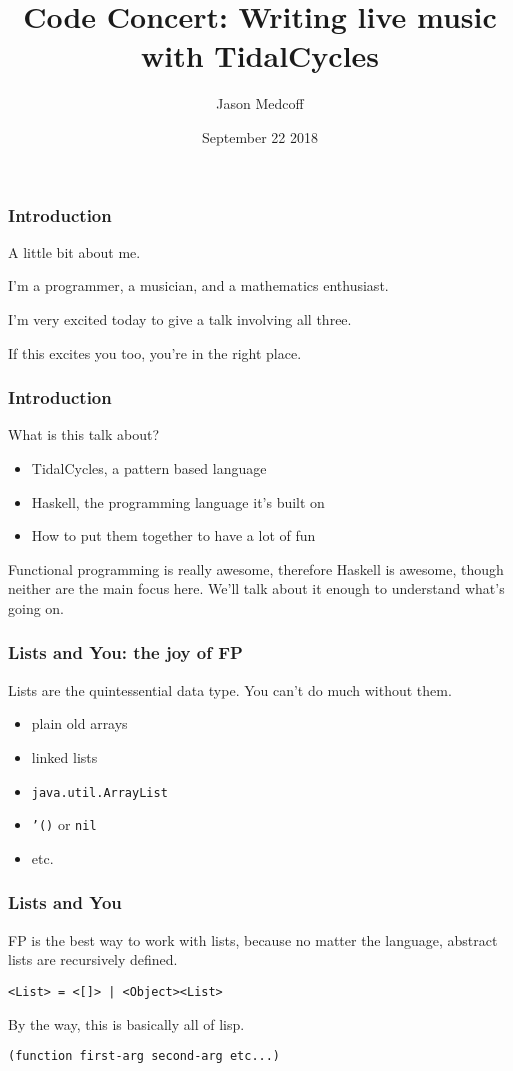 \documentclass{beamer}
\title[Code Concert]{Code Concert: Writing live music with TidalCycles}
\author{Jason Medcoff}
\date{September 22 2018}
\begin{document}
	\begin{frame}
		\frametitle{\space}
		\titlepage
	\end{frame}

	\begin{frame}
		\frametitle{Introduction}
		A little bit about me.
		
		I'm a programmer, a musician, and a mathematics enthusiast.
		
		I'm very excited today to give a talk involving all three.
		
		If this excites you too, you're in the right place.
	\end{frame}

	\begin{frame}
		\frametitle{Introduction}
		What is this talk about?
		
		\begin{itemize}
			\item TidalCycles, a pattern based language
			\item Haskell, the programming language it's built on
			\item How to put them together to have a lot of fun
		\end{itemize}
	
	Functional programming is really awesome, therefore Haskell is awesome, though neither are the main focus here. We'll talk about it enough to understand what's going on.
	\end{frame}

	\begin{frame}
		\frametitle{Lists and You: the joy of FP}
		Lists are the quintessential data type. You can't do much without them.
		
		\begin{itemize}
			\item plain old arrays
			\item linked lists
			\item \texttt{java.util.ArrayList}
			\item \texttt{'()} or \texttt{nil}
			\item etc.
		\end{itemize}
	\end{frame}

	\begin{frame}
		\frametitle{Lists and You}
		FP is the best way to work with lists, because no matter the language, abstract lists are recursively defined.
		
		\begin{center}
			\texttt{<List> = <[]> | <Object><List>}
		\end{center}
	
		By the way, this is basically all of lisp.
		\begin{center}
			\texttt{(function first-arg second-arg etc...)}
		\end{center}	
	\end{frame}
\end{document}
